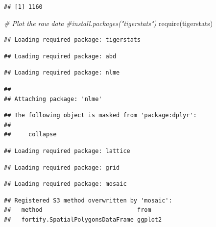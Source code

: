 \documentclass[
]{article}
\newenvironment{Shaded}{\begin{snugshade}}{\end{snugshade}}
\newcommand{\CommentTok}[1]{\textcolor[rgb]{0.56,0.35,0.01}{\textit{#1}}}
\newcommand{\FunctionTok}[1]{\textcolor[rgb]{0.00,0.00,0.00}{#1}}
\newcommand{\NormalTok}[1]{#1}
\newcommand{\SpecialCharTok}[1]{\textcolor[rgb]{0.00,0.00,0.00}{#1}}
\begin{document}
\begin{Shaded}
\end{Shaded}

\begin{verbatim}
## [1] 1160
\end{verbatim}

\begin{Shaded}
\begin{Highlighting}[]
\CommentTok{\# Plot the raw data}
\CommentTok{\#install.packages("tigerstats") }
\FunctionTok{require}\NormalTok{(tigerstats)}
\end{Highlighting}
\end{Shaded}

\begin{verbatim}
## Loading required package: tigerstats
\end{verbatim}

\begin{verbatim}
## Loading required package: abd
\end{verbatim}

\begin{verbatim}
## Loading required package: nlme
\end{verbatim}

\begin{verbatim}
## 
## Attaching package: 'nlme'
\end{verbatim}

\begin{verbatim}
## The following object is masked from 'package:dplyr':
## 
##     collapse
\end{verbatim}

\begin{verbatim}
## Loading required package: lattice
\end{verbatim}

\begin{verbatim}
## Loading required package: grid
\end{verbatim}

\begin{verbatim}
## Loading required package: mosaic
\end{verbatim}

\begin{verbatim}
## Registered S3 method overwritten by 'mosaic':
##   method                           from   
##   fortify.SpatialPolygonsDataFrame ggplot2
\end{verbatim}
\end{document}
